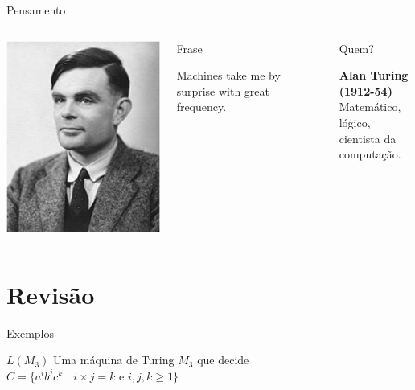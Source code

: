 \documentclass[xcolor=dvipsnames,table]{beamer}
\begin{document}
\begin{frame}{Pensamento}
		\begin{columns}
		  		\begin{center}
		    		\includegraphics[height=.5\textheight]{images/turing.png}
		  		\end{center}
				\begin{block}{Frase}
					\begin{center}
						{\large Machines take me by surprise with great frequency.}
					\end{center}
				\end{block}		  		
		  		\begin{block}{Quem?}
		  			\begin{center}
						{\bf Alan Turing (1912-54)} \\ Matemático, lógico, \\cientista da computação.
					\end{center}
				\end{block}
		\end{columns}
	\end{frame}
	
\section{Revisão}	

	\begin{frame}{Exemplos}
		\begin{block}{$L(M_3)$}
		Uma máquina de Turing $M_3$ que decide $C = \{ a^i b^j c^k \mbox{ | } i \times j = k \mbox{ e } i,j,k \geq 1 \}$		
		\end{block}
	\end{frame}
	
\end{document}
